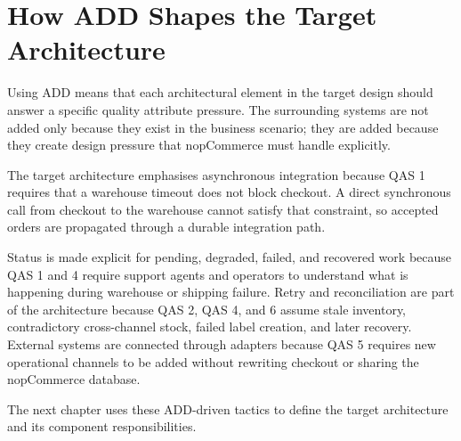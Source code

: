 \section{How ADD Shapes the Target Architecture}

Using ADD means that each architectural element in the target design should answer a specific
quality attribute pressure. The surrounding systems are not added only because they exist in the
business scenario; they are added because they create design pressure that nopCommerce must
handle explicitly.

The target architecture emphasises asynchronous integration because QAS 1 requires that a
warehouse timeout does not block checkout. A direct synchronous call from checkout to the
warehouse cannot satisfy that constraint, so accepted orders are propagated through a durable
integration path.

Status is made explicit for pending, degraded, failed, and recovered work because QAS 1
and 4 require support agents and operators to understand what is happening during warehouse or
shipping failure. Retry and reconciliation are part of the architecture because QAS 2, QAS 4,
and 6 assume stale inventory, contradictory cross-channel stock, failed label creation, and
later recovery. External systems are connected through adapters because QAS 5 requires new
operational channels to be added without rewriting checkout or sharing the nopCommerce database.

The next chapter uses these ADD-driven tactics to define the target architecture and its
component responsibilities.
